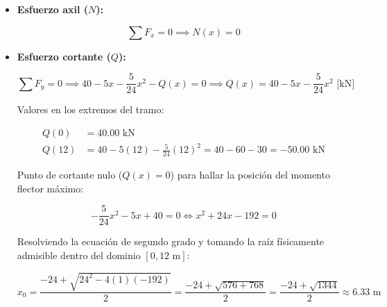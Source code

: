 \begin{itemize}

    \item \textbf{Esfuerzo axil ($N$):}

          \begin{equation}

              \sum F_x = 0 \implies \boxed{N(x) = 0}

          \end{equation}



    \item \textbf{Esfuerzo cortante ($Q$):}

          \begin{equation}

              \sum F_y = 0 \implies 40 - 5x - \frac{5}{24}x^2 - Q(x) = 0 \implies \boxed{Q(x) = 40 - 5x - \frac{5}{24}x^2\text{ [kN]}}

          \end{equation}

          Valores en los extremos del tramo:

          \begin{align*}

              Q(0)  & = 40.00\text{ kN}                                                   \\

              Q(12) & = 40 - 5(12) - \frac{5}{24}(12)^2 = 40 - 60 - 30 = -50.00\text{ kN}

          \end{align*}

          Punto de cortante nulo ($Q(x) = 0$) para hallar la posición del momento flector máximo:

          \begin{equation}

              -\frac{5}{24}x^2 - 5x + 40 = 0 \iff x^2 + 24x - 192 = 0

          \end{equation}

          Resolviendo la ecuación de segundo grado y tomando la raíz físicamente admisible dentro del dominio $[0, 12\text{ m}]$:

          \begin{equation}

              x_0 = \frac{-24 + \sqrt{24^2 - 4(1)(-192)}}{2} = \frac{-24 + \sqrt{576 + 768}}{2} = \frac{-24 + \sqrt{1344}}{2} \approx \boxed{6.33\text{ m}}


\end{equation}
\end{itemize}
